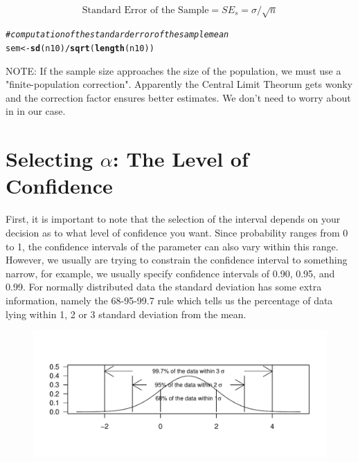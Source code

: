 \documentclass{tufte-handout}\usepackage[]{graphicx}\usepackage[]{color}
\makeatletter
\def\maxwidth{ %
  \ifdim\Gin@nat@width>\linewidth
    \linewidth
  \else
    \Gin@nat@width
  \fi
}
\newcommand{\hlcom}[1]{\textcolor[rgb]{0.678,0.584,0.686}{\textit{#1}}}%
\newcommand{\hlopt}[1]{\textcolor[rgb]{0,0,0}{#1}}%
\newcommand{\hlstd}[1]{\textcolor[rgb]{0.345,0.345,0.345}{#1}}%
\newcommand{\hlkwb}[1]{\textcolor[rgb]{0.69,0.353,0.396}{#1}}%
\newcommand{\hlkwd}[1]{\textcolor[rgb]{0.737,0.353,0.396}{\textbf{#1}}}%
\newenvironment{kframe}{%
 \def\at@end@of@kframe{}%
 \ifinner\ifhmode%
  \def\at@end@of@kframe{\end{minipage}}%
  \begin{minipage}{\columnwidth}%
 \fi\fi%
 \def\FrameCommand##1{\hskip\@totalleftmargin \hskip-\fboxsep
 \colorbox{shadecolor}{##1}\hskip-\fboxsep
     \hskip-\linewidth \hskip-\@totalleftmargin \hskip\columnwidth}%
 \MakeFramed {\advance\hsize-\width
   \@totalleftmargin\z@ \linewidth\hsize
   \@setminipage}}%
 {\par\unskip\endMakeFramed%
 \at@end@of@kframe}
\newenvironment{knitrout}{}{} %
\makeatother
\begin{document}
\begin{equation}
\textrm{Standard Error of the Sample} = SE_s = \sigma/\sqrt{n}
\end{equation}


\begin{knitrout}
\color{fgcolor}\begin{kframe}
\begin{alltt}
\hlcom{#computation of the standard error of the sample mean}
\hlstd{sem}\hlkwb{<-}\hlkwd{sd}\hlstd{(n10)}\hlopt{/}\hlkwd{sqrt}\hlstd{(}\hlkwd{length}\hlstd{(n10))}
\end{alltt}
\end{kframe}
\end{knitrout}

NOTE: If the sample size approaches the size of the population, we must use a "finite-population correction". Apparently the Central Limit Theorum gets wonky and the correction factor ensures better estimates. We don't need to worry about in in our case.

\section{Selecting $\alpha$: The Level of Confidence}

First, it is important to note that the selection of the interval depends on your decision as to what level of confidence you want. Since probability ranges from 0 to 1, the confidence intervals of the parameter can also vary within this range. However, we usually are trying to constrain the confidence interval to something narrow, for example, we usually specify confidence intervals of 0.90, 0.95, and 0.99. For normally distributed data the standard deviation has some extra information, namely the 68-95-99.7 rule which tells us the percentage of data lying within 1, 2 or 3 standard deviation from the mean.

\begin{figure}
\begin{knitrout}
\color{fgcolor}
\includegraphics[width=\maxwidth]{figure/unnamed-chunk-8-1} 

\end{knitrout}
\end{figure}
\end{document}
